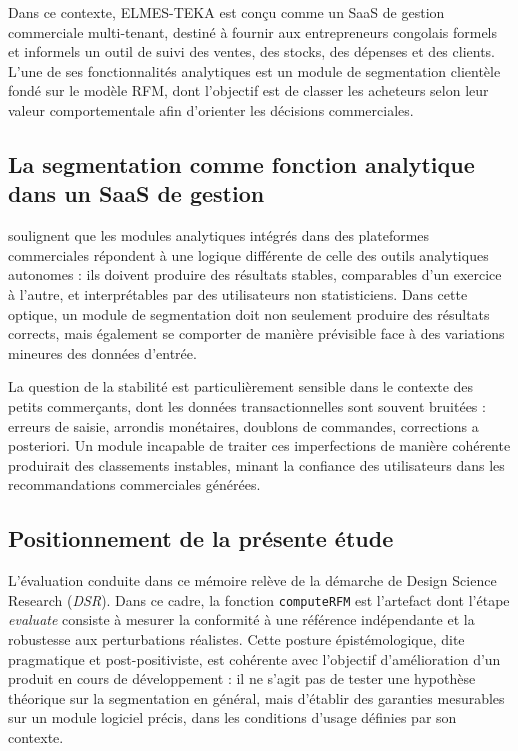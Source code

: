 Dans ce contexte, ELMES-TEKA est conçu comme un SaaS de gestion commerciale multi-tenant,
destiné à fournir aux entrepreneurs congolais formels et informels un outil de suivi des
ventes, des stocks, des dépenses et des clients. L'une de ses fonctionnalités analytiques
est un module de segmentation clientèle fondé sur le modèle RFM, dont l'objectif est de
classer les acheteurs selon leur valeur comportementale afin d'orienter les décisions
commerciales.

\subsection{La segmentation comme fonction analytique dans un SaaS de gestion}
\label{subsec:revue-segmentation-saas}

\citet{Salminen2023} soulignent que les modules analytiques intégrés dans des plateformes
commerciales répondent à une logique différente de celle des outils analytiques autonomes :
ils doivent produire des résultats stables, comparables d'un exercice à l'autre, et
interprétables par des utilisateurs non statisticiens. Dans cette optique, un module de
segmentation doit non seulement produire des résultats corrects, mais également se comporter
de manière prévisible face à des variations mineures des données d'entrée.

La question de la stabilité est particulièrement sensible dans le contexte des petits
commerçants, dont les données transactionnelles sont souvent bruitées : erreurs de saisie,
arrondis monétaires, doublons de commandes, corrections a posteriori. Un module incapable de
traiter ces imperfections de manière cohérente produirait des classements instables, minant
la confiance des utilisateurs dans les recommandations commerciales générées.

\subsection{Positionnement de la présente étude}
\label{subsec:revue-positionnement}

L'évaluation conduite dans ce mémoire relève de la démarche de Design Science Research
(\emph{DSR}). Dans ce cadre, la fonction \texttt{computeRFM} est l'artefact dont l'étape
\emph{evaluate} consiste à mesurer la conformité à une référence indépendante et la
robustesse aux perturbations réalistes. Cette posture épistémologique, dite pragmatique et
post-positiviste, est cohérente avec l'objectif d'amélioration d'un produit en cours de
développement : il ne s'agit pas de tester une hypothèse théorique sur la segmentation en
général, mais d'établir des garanties mesurables sur un module logiciel précis, dans les
conditions d'usage définies par son contexte.

